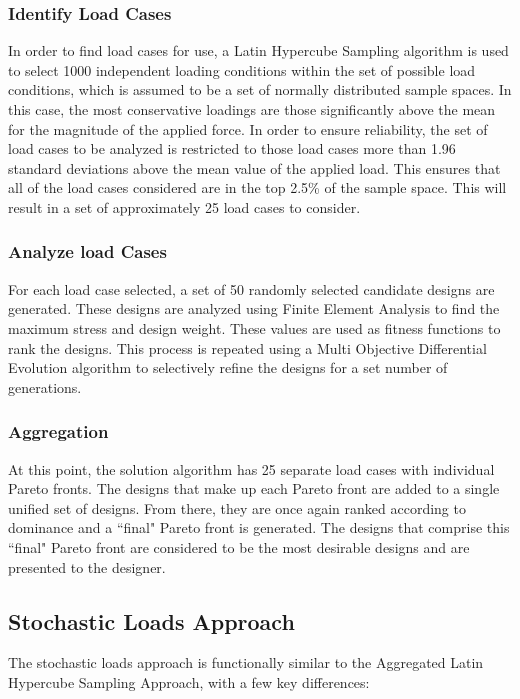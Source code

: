 \subsubsection{Identify Load Cases}
In order to find load cases for use, a Latin Hypercube Sampling algorithm is used to select 1000 independent loading conditions within the set of possible load conditions, which is assumed to be a set of normally distributed sample spaces. In this case, the most conservative loadings are those significantly above the mean for the magnitude of the applied force. In order to ensure reliability, the set of load cases to be analyzed is restricted to those load cases more than 1.96 standard deviations above the mean value of the applied load. This ensures that all of the load cases considered are in the top 2.5\% of the sample space. This will result in a set of approximately 25 load cases to consider. 
\subsubsection{Analyze load Cases} 
For each load case selected, a set of 50 randomly selected candidate designs are generated. These designs are analyzed using Finite Element Analysis to find the maximum stress and design weight. These values are used as fitness functions to rank the designs. This process is repeated using a Multi Objective Differential Evolution algorithm to selectively refine the designs for a set number of generations. 
\subsubsection{Aggregation}
At this point, the solution algorithm has 25 separate load cases with individual Pareto fronts. The designs that make up each Pareto front are added to a single unified set of designs. From there, they are once again ranked according to dominance and a ``final" Pareto front is generated. The designs that comprise this ``final" Pareto front are considered to be the most desirable designs and are presented to the designer.

\subsection{Stochastic Loads Approach}
The stochastic loads approach is functionally similar to the Aggregated Latin Hypercube Sampling Approach, with a few key differences: 

